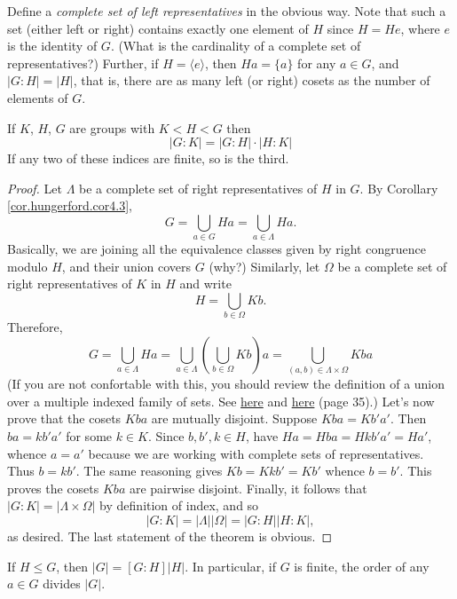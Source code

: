 \documentclass[11pt,a4paper]{article}
\begin{document}
Define a \textit{complete set of left representatives} in the obvious way.
Note that such a set (either left or right) contains exactly one element of \(H\) since \(H = He\), where \(e\) is the identity of \(G\).
(What is the cardinality of a complete set of representatives?)
Further, if \(H=\langle e\rangle\), then \(Ha = \{a\} \) for any \(a\in G\), and \(|G:H| = |H|\), that is, there are as many left (or right) cosets as the number of elements of \(G\).

\begin{teo}
    If $K$, $H$, $G$ are groups  with $K<H<G$ then
\[
|G: K|=|G: H| \cdot|H: K|
\]
If any two of these indices are finite, so is the third.
\end{teo}

\begin{proof}
    Let \(\Lambda\) be a complete set of right representatives of \(H\) in \(G\).
    By Corollary \ref{cor.hungerford.cor4.3}, \[G=\bigcup_{a \in G} Ha =  \bigcup_{a \in \Lambda} Ha.\]
    Basically, we are joining all the equivalence classes given by right congruence modulo \(H\), and their union covers \(G\) (why?)
    Similarly, let \(\Omega\) be a complete set of right representatives of \(K\) in \(H\) and write \[H = \bigcup_{b \in \Omega } Kb  .\]
    Therefore, \[G = \bigcup_{a \in\Lambda} Ha =\bigcup_{a \in\Lambda} \left( \bigcup_{b \in \Omega } Kb \right)a = \bigcup_{(a,b) \in \Lambda\times \Omega} Kba\]
    (If you are not confortable with this, you should review the definition of a union over a multiple indexed family of sets. See \href{https://en.wikipedia.org/wiki/List_of_set_identities_and_relations#Definitions}{here} and \href{https://www.gornahoor.net/library/Halmos_NaiveSetTheory.pdf}{here} (page 35).)
    Let's now prove that the cosets \(Kba\) are mutually disjoint.
    Suppose \(Kba = Kb'a'\).
    Then \(ba = kb'a'\) for some \(k\in K\).
    Since \(b,b',k\in H\), have \(Ha = H ba = H kb'a' = H a'\), whence \(a=a'\) because we are working with complete sets of representatives.
    Thus \(b = kb'\).
    The same reasoning gives \(Kb = Kkb' = Kb'\) whence \(b=b'\).
    This proves the cosets \(Kba\) are pairwise disjoint.
    Finally, it follows that \(|G:K| = |\Lambda\times \Omega|\) by definition of index, and so  \[|G:K| = |\Lambda||\Omega| = |G:H| |H:K|,\]
    as desired.
    The last statement of the theorem is obvious.
\end{proof}


\begin{cor}
    If \( H \leq G \), then \( |G| = [G : H] |H| \). 
In particular, if \( G \) is finite, the order of  any \( a \in G \) divides \( |G| \).
\end{cor}
\end{document}
